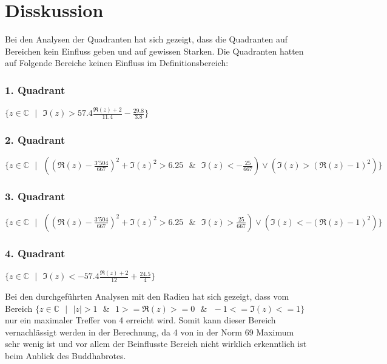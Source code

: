\section{Disskussion}
Bei den Analysen der Quadranten hat sich gezeigt, dass die Quadranten auf Bereichen kein Einfluss geben und auf gewissen Starken. Die Quadranten hatten auf Folgende Bereiche keinen Einfluss im Definitionsbereich:
\begin{center}
\subsubsection*{1. Quadrant}
$\{z \in \mathbb{C}\text{ }|\text{ }\Im(z)>57.4\frac{\Re(z)+2}{11.4}-\frac{29.8}{3.8}\}$
\subsubsection*{2. Quadrant}
$\{z \in \mathbb{C}\text{ }|\text{ }((\Re(z)-\frac{3'504}{667})^2+\Im(z)^2>6.25 \text{ }\&\text{ } \Im(z) < -\frac{25}{667}) \lor (\Im(z)>(\Re(z)-1)^2) \}$
\subsubsection*{3. Quadrant}
$\{z \in \mathbb{C}\text{ }|\text{ }((\Re(z)-\frac{3'504}{667})^2+\Im(z)^2>6.25 \text{ }\&\text{ } \Im(z) > \frac{25}{667}) \lor (\Im(z)<-(\Re(z)-1)^2) \}$
\subsubsection*{4. Quadrant}
$\{z \in \mathbb{C}\text{ }|\text{ }\Im(z)<-57.4\frac{\Re(z)+2}{12}+\frac{24.5}{4}\}$\\
\end{center}
Bei den durchgeführten Analysen mit den Radien hat sich gezeigt, dass vom Bereich $\{z \in \mathbb{C}\text{ }|\text{ } |z| >1\text{ } \& \text{ } 1>=\Re(z)>=0 \text{ } \& \text{ }-1<=\Im(z)<=1\}$ nur ein maximaler Treffer von 4 erreicht wird. Somit kann dieser Bereich vernachlässigt werden in der Berechnung, da 4 von in der Norm 69 Maximum sehr wenig ist und vor allem der Beinflusste Bereich nicht wirklich erkenntlich ist beim Anblick des Buddhabrotes.